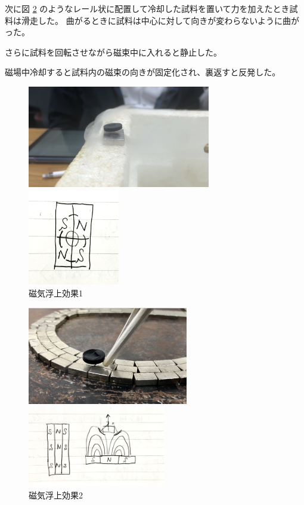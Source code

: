 \documentclass[uplatex,dvipdfmx,a4paper,11pt]{jlreq}
\numberwithin{equation}{section}
\theoremstyle{definition}
\begin{document}
次に図 \ref{fig:mag2} のようなレール状に配置して冷却した試料を置いて力を加えたとき試料は滑走した。
曲がるときに試料は中心に対して向きが変わらないように曲がった。

さらに試料を回転させながら磁束中に入れると静止した。

磁場中冷却すると試料内の磁束の向きが固定化され、裏返すと反発した。

\begin{figure}[htbp]
  \begin{minipage}[b]{0.5\linewidth}
    \centering
    \includegraphics[keepaspectratio, width=8cm]{./assets/YBCO_image2.jpg}
  \end{minipage}
  \begin{minipage}[b]{0.5\linewidth}
    \centering
    \includegraphics[keepaspectratio, width=4cm]{./assets/YBCO_magnet.jpg}
  \end{minipage}
  \caption{磁気浮上効果1}
  \label{fig:mag1}
\end{figure}
\begin{figure}[htbp]
  \begin{minipage}[b]{0.5\linewidth}
    \centering
    \includegraphics[keepaspectratio, width=7cm]{./assets/YBCO_image3.jpg}
  \end{minipage}
  \begin{minipage}[b]{0.5\linewidth}
    \centering
    \includegraphics[keepaspectratio, width=6cm]{./assets/YBCO_mag_line.jpg}
  \end{minipage}
  \caption{磁気浮上効果2}
  \label{fig:mag2}
\end{figure}
\end{document}
